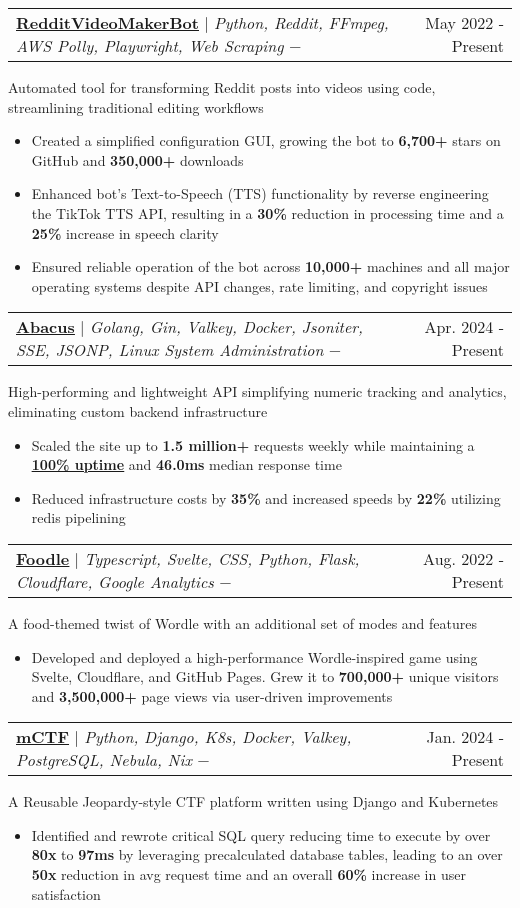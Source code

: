 \documentclass[11pt,letterpaper]{article}
\makeatletter
\newcommand{\resumeItem}[1]{
    \item\small{
            {#1 \vspace{-2pt}}
    }
}
\newcommand{\resumeProjectHeadingWithDescription}[4]{
    \item
    \begin{tabular*}{0.97\textwidth}{l@{\extracolsep{\fill}}r}
    \small#2 $-$ \githubUrl{#1} & #3 \\
    \end{tabular*}
    \vspace{-7pt}
    \small{#4}
}
\newcommand{\resumeItemListStart}{\begin{itemize}}
\newcommand{\resumeItemListEnd}{\end{itemize}\vspace{-5pt}}
\newcommand{\utextbf}[1]{\underline{\textbf{#1}}}
\newcommand{\githubUrl}[1]{%
\href{#1}{\faGithub}%
}
\makeatother
\begin{document}
\resumeProjectHeadingWithDescription
{https://github.com/elebumm/RedditVideoMakerBot}
{\underline{\href{https://github.com/elebumm/RedditVideoMakerBot}{\textbf{RedditVideoMakerBot}}} $|$ \emph{Python, Reddit, FFmpeg, AWS Polly, Playwright, Web Scraping}}{May 2022 - Present}
{Automated tool for transforming Reddit posts into videos using code, streamlining traditional editing workflows}
\resumeItemListStart
\resumeItem{Created a simplified configuration GUI, growing the bot to \textbf{6,700+} stars on GitHub and \textbf{350,000+} downloads}
\resumeItem{Enhanced bot's Text-to-Speech (TTS) functionality by reverse engineering the TikTok TTS API, resulting in a \textbf{30\%} reduction in processing time and a \textbf{25\%} increase in speech clarity}
\resumeItem{Ensured reliable operation of the bot across \textbf{10,000+} machines and all major operating systems despite API changes, rate limiting, and copyright issues}
\resumeItemListEnd

\resumeProjectHeadingWithDescription
{https://github.com/JasonLovesDoggo/abacus}
{\underline{\textbf{\href{https://abacus.jasoncameron.dev}{Abacus}}} $|$ \emph{Golang, Gin, Valkey, Docker, Jsoniter, SSE, JSONP, Linux System Administration }}{Apr. 2024 - Present}
{High-performing and lightweight API simplifying numeric tracking and analytics, eliminating custom backend infrastructure}
\resumeItemListStart
\resumeItem{Scaled the site up to \textbf{1.5 million+} requests weekly while maintaining a \utextbf{\href{https://www.apianalytics.dev/monitoring/b92525b5012d440a93cbdf39e6c34ed8}{100\% uptime}} and \textbf{46.0ms} median response time}
\resumeItem{Reduced infrastructure costs by \textbf{35\%} and increased speeds by \textbf{22\%} utilizing redis pipelining}
\resumeItemListEnd

\resumeProjectHeadingWithDescription
{https://github.com/JasonLovesDoggo/foodle}
{\underline{\href{https://jasoncameron.dev/foodle}{\textbf{Foodle}}} $|$ \emph{Typescript, Svelte, CSS, Python, Flask, Cloudflare, Google Analytics}} {Aug. 2022 - Present}
{A food-themed twist of Wordle with an additional set of modes and features}
\resumeItemListStart
\resumeItem{Developed and deployed a high-performance Wordle-inspired game using Svelte, Cloudflare, and GitHub Pages. Grew it to \textbf{700,000+} unique visitors and \textbf{3,500,000+} page views via user-driven improvements}
\resumeItemListEnd

\resumeProjectHeadingWithDescription
{https://github.com/mcpt/ctf}
{\underline{\textbf{\href{https://ctf.mcpt.ca}{mCTF}}} $|$ \emph{Python, Django, K8s, Docker, Valkey, PostgreSQL, Nebula, Nix}}{Jan. 2024 - Present}
{A Reusable Jeopardy-style CTF platform written using Django and Kubernetes}
\resumeItemListStart
\resumeItem{Identified and rewrote critical SQL query reducing time to execute by over \textbf{80x} to \textbf{97ms} by leveraging precalculated database tables, leading to an over \textbf{50x} reduction in avg request time and an overall \textbf{60\%} increase in user satisfaction}
\resumeItemListEnd
\end{document}
